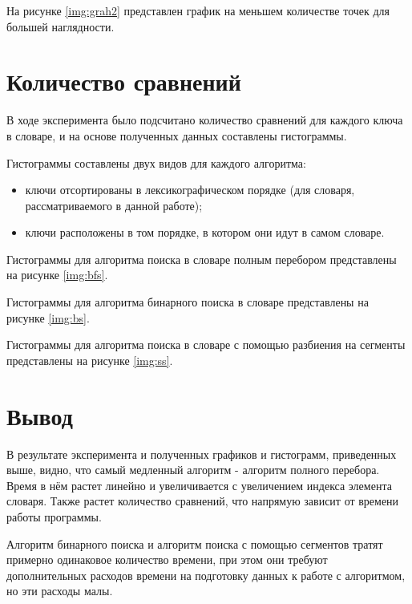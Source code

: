 
На рисунке \ref{img:grah2} представлен график на меньшем количестве точек для большей наглядности.

\newpage

\section{Количество сравнений}
В ходе эксперимента было подсчитано количество сравнений для каждого ключа в словаре, и на основе полученных данных составлены гистограммы.

Гистограммы составлены двух видов для каждого алгоритма:
\begin{itemize}
	\item ключи отсортированы в лексикографическом порядке (для словаря, рассматриваемого в данной работе);
	\item ключи расположены в том порядке, в котором они идут в самом словаре.	
\end{itemize}

Гистограммы для алгоритма поиска в словаре полным перебором представлены на рисунке \ref{img:bfs}.



Гистограммы для алгоритма бинарного поиска в словаре представлены на рисунке \ref{img:bs}.


Гистограммы для алгоритма поиска в словаре с помощью разбиения на сегменты представлены на рисунке \ref{img:ss}.

\clearpage

\section{Вывод}
В результате эксперимента и полученных графиков и гистограмм, приведенных выше, видно, что самый медленный алгоритм - алгоритм полного перебора. Время в нём растет линейно и увеличивается с увеличением индекса элемента словаря. Также растет количество сравнений, что напрямую зависит от времени работы программы.

Алгоритм бинарного поиска и алгоритм поиска с помощью сегментов тратят примерно одинаковое количество времени, при этом они требуют дополнительных расходов времени на $  $подготовку данных к работе с алгоритмом, но эти расходы малы.